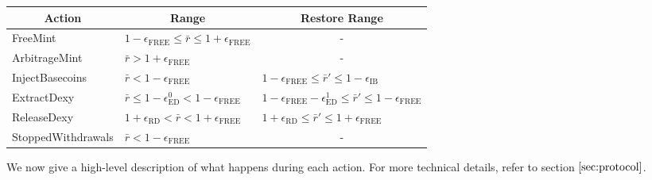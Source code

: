 \documentclass{ifcolog}
\newcommand{\rr}{\bar{r}}
\newcommand{\epsilonfree}{\epsilon_{\textrm{FREE}}}
\begin{document}
\begin{table}[h]
\begin{tabular}{|l|l|l|}
\hline
\multicolumn{1}{|c|}{\textbf{Action}} & \multicolumn{1}{c|}{\textbf{Range}}                                     & \multicolumn{1}{c|}{\textbf{Restore Range}}                                                           \\ \hline
FreeMint                              & $1- \epsilon_{\textrm{FREE}} \le \rr \le 1+ \epsilon_{\textrm{FREE}}$   & \multicolumn{1}{c|}{-}                                                                                \\ \hline
ArbitrageMint                         & $\rr > 1 + \epsilon_{\textrm{FREE}}$                                    & \multicolumn{1}{c|}{-}                                                                                \\ \hline
InjectBasecoins                       & $\rr < 1 - \epsilon_{\textrm{FREE}}$                                    & $1 - \epsilon_{\textrm{FREE}} \le \rr' \le 1-\epsilon_{\textrm{IB}}$                                  \\ \hline
ExtractDexy                           & $\rr \le 1 - \epsilon_{\textrm{ED}}^{0} < 1 - \epsilon_{\textrm{FREE}}$ & $1 - \epsilon_{\textrm{FREE}} - \epsilon_{\textrm{ED}}^{1} \le \rr' \le 1-\epsilon_{\textrm{FREE}}$   \\ \hline
ReleaseDexy                           & $1 + \epsilon_{\textrm{RD}} < \rr <  1 + \epsilon_{\textrm{FREE}}$      & $1 + \epsilon_{\textrm{RD}} \le \rr' \le 1 + \epsilonfree$                                                                 \\ \hline
StoppedWithdrawals                    & $\rr < 1 - \epsilon_{\textrm{FREE}}$                                    & \multicolumn{1}{c|}{-}                                                                  \\ \hline
\end{tabular}
\end{table}

We now give a high-level description of what happens during each action. For more technical details, refer to section $\ref{sec:protocol}$.
\end{document}
